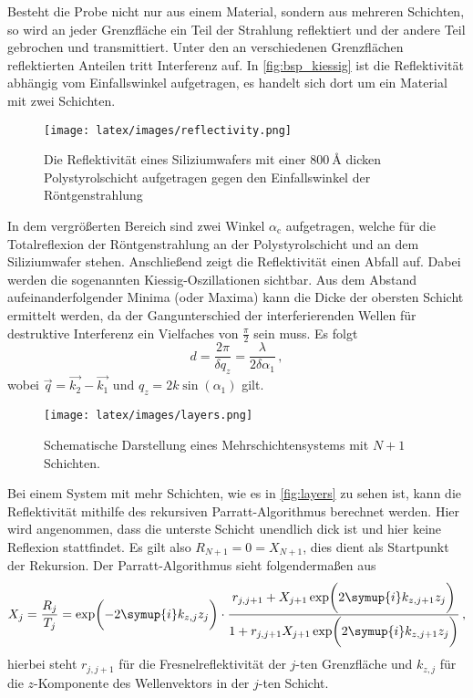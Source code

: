         \noindent 
        Besteht die Probe nicht nur aus einem Material, sondern aus mehreren Schichten, so wird an jeder Grenzfläche ein Teil der Strahlung reflektiert und 
        der andere Teil gebrochen und transmittiert. Unter den an verschiedenen Grenzflächen reflektierten Anteilen tritt Interferenz auf. In 
        \autoref{fig:bsp_kiessig} ist die Reflektivität abhängig vom Einfallswinkel aufgetragen, es handelt sich dort um ein Material mit zwei Schichten. 
        \begin{figure}
            \centering
            \texttt{[image: latex/images/reflectivity.png]}
            \caption{Die Reflektivität eines Siliziumwafers mit einer $\SI{800}{\angstrom}$ dicken Polystyrolschicht aufgetragen gegen den Einfallswinkel der Röntgenstrahlung}
            \label{fig:bsp_kiessig}
        \end{figure}
        In dem vergrößerten Bereich sind zwei Winkel $\alpha_\text{c}$ aufgetragen, welche für die Totalreflexion der Röntgenstrahlung an der Polystyrolschicht 
        und an dem Siliziumwafer stehen. Anschließend zeigt die Reflektivität einen Abfall auf. Dabei werden die sogenannten Kiessig-Oszillationen 
        sichtbar. Aus dem Abstand aufeinanderfolgender Minima (oder Maxima) kann die Dicke der obersten Schicht ermittelt werden, da der Gangunterschied 
        der interferierenden Wellen für destruktive Interferenz ein Vielfaches von $\frac{\pi}{2}$ sein muss. 
        Es folgt
        \begin{equation*}
            d = \frac{2 \pi}{\delta q_z} = \frac{\lambda}{2 \delta \alpha_1}\, ,
        \end{equation*} 
        wobei $\vec{q} = \vec{k_2} - \vec{k_1}$ und $q_z = 2 k \sin(\alpha_1)$ gilt.

         
        \begin{figure}%
            \centering%
            \texttt{[image: latex/images/layers.png]}%
            \caption{Schematische Darstellung eines Mehrschichtensystems mit $N+1$ Schichten.}%
            \label{fig:layers}%
        \end{figure}
        \noindent
        Bei einem System mit mehr Schichten, wie es in \autoref{fig:layers} zu sehen ist, kann die Reflektivität mithilfe des rekursiven Parratt-Algorithmus 
        berechnet werden. Hier wird angenommen, dass die unterste Schicht unendlich dick ist und hier keine Reflexion stattfindet. Es gilt also 
        $R_{N+1} = 0 = X_{N+1}$, dies dient als Startpunkt der Rekursion. Der Parratt-Algorithmus sieht folgendermaßen aus
        \begin{equation*}
            X_j = \frac{R_j}{T_j} = \exp\biggl( - 2 \symup{i} k_{z,j}z_j\biggr) \cdot \frac{r_{j, j+1} + X_{j+1}\exp\biggl(2 \symup{i} k_{z, j+1} z_j\biggr)}{1+ r_{j, j+1} X_{j+1}\exp\biggl(2 \symup{i} k_{z, j+1} z_j\biggr)}\, ,
        \end{equation*}
        hierbei steht $r_{j, j+1}$ für die Fresnelreflektivität der $j$-ten Grenzfläche und $k_{z,j}$ für die $z$-Komponente des Wellenvektors in der $j$-ten Schicht. 

